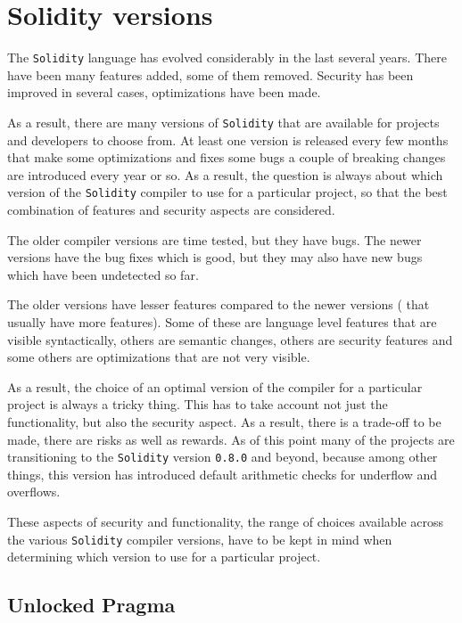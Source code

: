\section{Solidity versions}\label{solidity-versions}

The \texttt{Solidity} language has evolved considerably in the last
several years. There have been many features added, some of them
removed. Security has been improved in several cases, optimizations have
been made.

As a result, there are many versions of \texttt{Solidity} that are
available for projects and developers to choose from. At least one
version is released every few months that make some optimizations and
fixes some bugs a couple of breaking changes are introduced every year
or so. As a result, the question is always about which version of the
\texttt{Solidity} compiler to use for a particular project, so that the
best combination of features and security aspects are considered.

The older compiler versions are time tested, but they have bugs. The
newer versions have the bug fixes which is good, but they may also have
new bugs which have been undetected so far.

The older versions have lesser features compared to the newer versions (
that usually have more features). Some of these are language level
features that are visible syntactically, others are semantic changes,
others are security features and some others are optimizations that are
not very visible.

As a result, the choice of an optimal version of the compiler for a
particular project is always a tricky thing. This has to take account
not just the functionality, but also the security aspect. As a result,
there is a trade-off to be made, there are risks as well as rewards. As
of this point many of the projects are transitioning to the
\texttt{Solidity} version \texttt{0.8.0} and beyond, because among other
things, this version has introduced default arithmetic checks for
underflow and overflows.

These aspects of security and functionality, the range of choices
available across the various \texttt{Solidity} compiler versions, have
to be kept in mind when determining which version to use for a
particular project.

\subsection{Unlocked Pragma}\label{unlocked-pragma}

